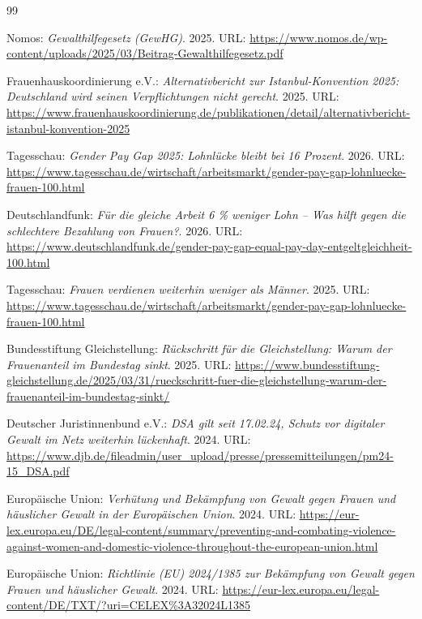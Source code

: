 \documentclass[12pt,a4paper]{article}
\begin{document}
	\begin{thebibliography}{99}
		
		Nomos: \emph{Gewalthilfegesetz (GewHG)}. 2025.
		URL: \url{https://www.nomos.de/wp-content/uploads/2025/03/Beitrag-Gewalthilfegesetz.pdf}
		
		Frauenhauskoordinierung e.V.: \emph{Alternativbericht zur Istanbul-Konvention 2025: Deutschland wird seinen Verpflichtungen nicht gerecht}. 2025.
		URL: \url{https://www.frauenhauskoordinierung.de/publikationen/detail/alternativbericht-istanbul-konvention-2025}
		
		Tagesschau: \emph{Gender Pay Gap 2025: Lohnlücke bleibt bei 16 Prozent}. 2026.
		URL: \url{https://www.tagesschau.de/wirtschaft/arbeitsmarkt/gender-pay-gap-lohnluecke-frauen-100.html}
		
		Deutschlandfunk: \emph{Für die gleiche Arbeit 6 \% weniger Lohn – Was hilft gegen die schlechtere Bezahlung von Frauen?}. 2026.
		URL: \url{https://www.deutschlandfunk.de/gender-pay-gap-equal-pay-day-entgeltgleichheit-100.html}
		
		Tagesschau: \emph{Frauen verdienen weiterhin weniger als Männer}. 2025.
		URL: \url{https://www.tagesschau.de/wirtschaft/arbeitsmarkt/gender-pay-gap-lohnluecke-frauen-100.html}
		
		Bundesstiftung Gleichstellung: \emph{Rückschritt für die Gleichstellung: Warum der Frauenanteil im Bundestag sinkt}. 2025.
		URL: \url{https://www.bundesstiftung-gleichstellung.de/2025/03/31/rueckschritt-fuer-die-gleichstellung-warum-der-frauenanteil-im-bundestag-sinkt/}
		
		Deutscher Juristinnenbund e.V.: \emph{DSA gilt seit 17.02.24, Schutz vor digitaler Gewalt im Netz weiterhin lückenhaft}. 2024.
		URL: \url{https://www.djb.de/fileadmin/user_upload/presse/pressemitteilungen/pm24-15_DSA.pdf}
		
		Europäische Union: \emph{Verhütung und Bekämpfung von Gewalt gegen Frauen und häuslicher Gewalt in der Europäischen Union}. 2024.
		URL: \url{https://eur-lex.europa.eu/DE/legal-content/summary/preventing-and-combating-violence-against-women-and-domestic-violence-throughout-the-european-union.html}
		
		Europäische Union: \emph{Richtlinie (EU) 2024/1385 zur Bekämpfung von Gewalt gegen Frauen und häuslicher Gewalt}. 2024.
		URL: \url{https://eur-lex.europa.eu/legal-content/DE/TXT/?uri=CELEX\%3A32024L1385}
		

\end{thebibliography}
\end{document}
